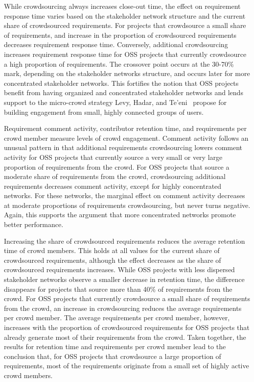 While crowdsourcing always increases close-out time, the effect on requirement response time varies based on the stakeholder network structure and the current share of crowdsourced requirements. For projects that crowdsource a small share of requirements, and increase in the proportion of crowdsourced requirements decreases requirement response time. Conversely, additional crowdsourcing increases requirement response time for OSS projects that currently crowdsource a high proportion of requirements. The crossover point occurs at the 30-70\% mark, depending on the stakeholder networks structure, and occurs later for more concentrated stakeholder networks. This fortifies the notion that OSS projects benefit from having organized and concentrated stakeholder networks and lends support to the micro-crowd strategy Levy, Hadar, and Te'eni~\cite{levy} propose for building engagement from small, highly connected groups of users.

Requirement comment activity, contributor retention time, and requirements per crowd member measure levels of crowd engagement. Comment activity follows an unusual pattern in that additional requirements crowdsourcing lowers comment activity for OSS projects that currently source a very small or very large proportion of requirements from the crowd. For OSS projects that source a moderate share of requirements from the crowd, crowdsourcing additional requirements decreases comment activity, except for highly concentrated networks. For these networks, the marginal effect on comment activity decreases at moderate proportions of requirements crowdsourcing, but never turns negative. Again, this supports the argument that more concentrated networks promote better performance.

Increasing the share of crowdsourced requirements reduces the average retention time of crowd members. This holds at all values for the current share of crowdsourced requirements, although the effect decreases as the share of crowdsourced requirements increases. While OSS projects with less dispersed stakeholder networks observe a smaller decrease in retention time, the difference disappears for projects that source more than 40\% of requirements from the crowd. For OSS projects that currently crowdsource a small share of requirements from the crowd, an increase in crowdsourcing reduces the average requirements per crowd member. The average requirements per crowd member, however, increases with the proportion of crowdsourced requirements for OSS projects that already generate most of their requirements from the crowd. Taken together, the results for retention time and requirements per crowd member lead to the conclusion that, for OSS projects that crowdsource a large proportion of requirements, most of the requirements originate from a small set of highly active crowd members. 

